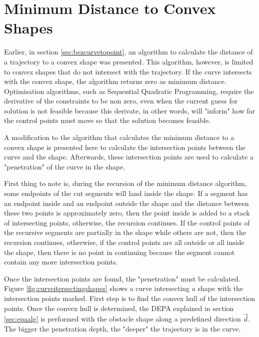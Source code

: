 \section{Minimum Distance to Convex Shapes}
\label{sec:mindistconvshapes}

\par Earlier, in section \ref{sec:bezcurvetopoint}, an algorithm to calculate the distance of a trajectory to a convex shape was presented. This algorithm, however, is limited to convex shapes that do not intersect with the trajectory. If the curve intersects with the convex shape, the algorithm returns zero as minimum distance. Optimisation algorithms, such as Sequential Quadratic Programming\cite{10.1007/978-0-387-35514-6_7}, require the derivative of the constraints to be non zero, even when the current guess for solution is not feasible because this derivate, in other words, will "inform" how far the control points must move so that the solution becomes feasible.

\par A modification to the algorithm that calculates the minimum distance to a convex shape is presented here to calculate the intersection points between the curve and the shape. Afterwards, these intersection points are used to calculate a "penetration" of the curve in the shape.
\par First thing to note is, during the recursion of the minimum distance algorithm, some endpoints of the cut segments will land inside the shape. If a segment has an endpoint inside and an endpoint outside the shape and the distance between these two points is approximately zero, then the point inside is added to a stack of intersecting points, otherwise, the recursion continues. If the control points of the recursive segments are partially in the shape while others are not, then the recursion continues, otherwise, if the control points are all outside or all inside the shape, then there is no point in continuing because the segment cannot contain any more intersection points.
\par Once the intersection points are found, the "penetration" must be calculated. Figure \ref{fig:curveitersectingshapes} shows a curve intersecting a shape with the intersection points marked. First step is to find the convex hull of the intersection points. Once the convex hull is determined, the \ac{DEPA} explained in section \ref{sec:epaalg}  is performed with the obstacle shape along a predefined direction $\overrightarrow{d}$. The bigger the penetration depth, the "deeper" the trajectory is in the curve.

